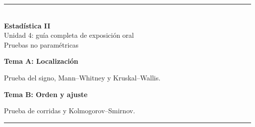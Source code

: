 \documentclass[11pt,a4paper]{article}
\begin{document}

\begin{titlepage}
\thispagestyle{empty}\centering\vspace*{2cm}
{\color{azul}\rule{\textwidth}{1.2pt}}\\[1.2cm]
{\fontsize{28}{33}\selectfont\bfseries\color{azul} Estadística II}\\[5mm]
{\LARGE Unidad 4: guía completa de exposición oral}\\[4mm]
{\large Pruebas no paramétricas}\\[1.1cm]
\begin{tcolorbox}[width=.82\textwidth,colback=grisclaro,colframe=azul]
\RaggedRight\textbf{Tema A: Localización}\par
Prueba del signo, Mann--Whitney y Kruskal--Wallis.\par\medskip
\textbf{Tema B: Orden y ajuste}\par
Prueba de corridas y Kolmogorov--Smirnov.
\end{tcolorbox}\vfill
{\color{azul}\rule{\textwidth}{1.2pt}}
\end{titlepage}
\clearpage
{}

\tableofcontents
\newpage
{}
\end{document}
